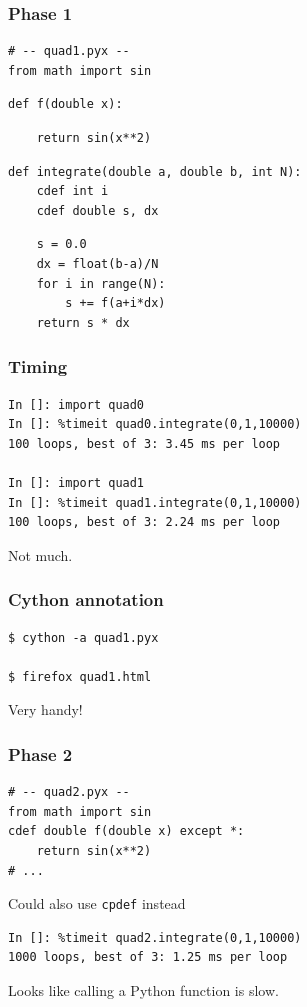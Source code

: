 \documentclass[14pt,compress]{beamer}
\newcounter{time}
\newcommand{\inctime}[1]{\addtocounter{time}{#1}{\tiny \thetime\ m}}
\newcommand{\typ}[1]{\lstinline{#1}}
\begin{document}
\begin{frame}[fragile]
    \frametitle{Phase 1}
    \vspace*{-0.2in}
\begin{lstlisting}
# -- quad1.pyx --
from math import sin
\end{lstlisting}
\begin{lstlisting}
def f(double x):
\end{lstlisting}
\vspace*{-1ex}
\begin{lstlisting}
    return sin(x**2)
\end{lstlisting}
\begin{lstlisting}
def integrate(double a, double b, int N):
    cdef int i
    cdef double s, dx
\end{lstlisting}
\vspace*{-1ex}
\begin{lstlisting}
    s = 0.0
    dx = float(b-a)/N
    for i in range(N):
        s += f(a+i*dx)
    return s * dx
\end{lstlisting}

\end{frame}

\begin{frame}[fragile]
    \frametitle{Timing}
\begin{lstlisting}
In []: import quad0
In []: %timeit quad0.integrate(0,1,10000)
100 loops, best of 3: 3.45 ms per loop

In []: import quad1
In []: %timeit quad1.integrate(0,1,10000)
100 loops, best of 3: 2.24 ms per loop
\end{lstlisting}
Not much.
\end{frame}

\begin{frame}[fragile]
    \frametitle{Cython annotation}
\begin{lstlisting}
$ cython -a quad1.pyx

$ firefox quad1.html
\end{lstlisting}
Very handy!

\inctime{15}
\end{frame}


\begin{frame}[fragile]
    \frametitle{Phase 2}
\begin{lstlisting}
# -- quad2.pyx --
from math import sin
cdef double f(double x) except *:
    return sin(x**2)
# ...
\end{lstlisting}
Could also use \typ{cpdef} instead

\begin{lstlisting}
In []: %timeit quad2.integrate(0,1,10000)
1000 loops, best of 3: 1.25 ms per loop
\end{lstlisting}
Looks like calling a Python function is slow.

\end{frame}
\end{document}
